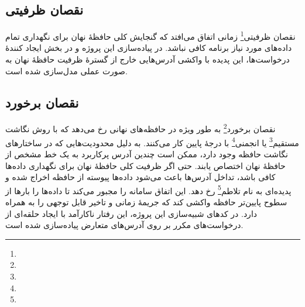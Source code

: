 \subsection{نقصان ظرفیتی}
نقصان ظرفیتی\footnote{} زمانی اتفاق می‌افتد که گنجایش کلی حافظهٔ نهان برای نگهداری تمام داده‌های مورد نیاز برنامه کافی نباشد. در پیاده‌سازی این پروژه و در بخش ایجاد کنندهٔ درخواست‌ها، این پدیده با واکشی آدرس‌هایی خارج از گسترهٔ ظرفیت حافظهٔ نهان به صورت عملی مدل‌سازی شده است.

\subsection{نقصان برخورد}
نقصان برخورد\footnote{} به طور ویژه در حافظه‌های نهانی رخ می‌دهد که با روش نگاشت مستقیم\footnote{} یا انجمنی\footnote{} با درجهٔ پایین کار می‌کنند. به دلیل محدودیت‌هایی که در ساختارهای نگاشت حافظه وجود دارد، ممکن است چندین آدرس پرکاربرد به یک خط مشخص از حافظهٔ نهان اختصاص یابند. حتی اگر ظرفیت کلی حافظهٔ نهان برای نگهداری داده‌ها کافی باشد، تداخل آدرس‌ها باعث می‌شود داده‌ها پیوسته از حافظه اخراج شده و پدیده‌ای به نام تلاطم\footnote{} رخ دهد. این اتفاق سامانه را مجبور می‌کند تا داده‌ها را بارها از سطوح پایین‌تر حافظه واکشی کند که جریمهٔ زمانی و تاخیر قابل توجهی را به همراه دارد. در کدهای شبیه‌سازی این پروژه، این رفتار ناکارآمد با ایجاد حلقه‌ای از درخواست‌های مکرر بر روی آدرس‌های متعارض پیاده‌سازی شده است.